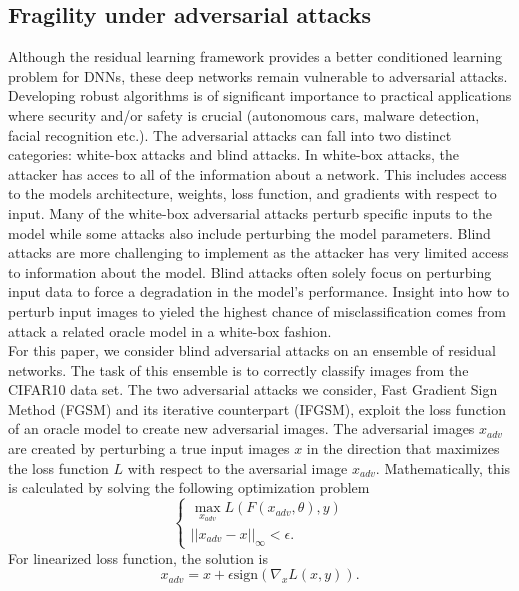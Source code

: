 \documentclass[12pt]{article}
\begin{document}
\subsection{Fragility under adversarial attacks}
Although the residual learning framework provides a better conditioned learning problem for DNNs, these deep networks remain vulnerable to adversarial attacks. Developing robust algorithms is of significant importance to practical applications where security and/or safety is crucial (autonomous cars, malware detection, facial recognition etc.). The adversarial attacks can fall into two distinct categories: white-box attacks and blind attacks. In white-box attacks, the attacker has acces to all of the information about a network. This includes access to the models architecture, weights, loss function, and gradients with respect to input. Many of the white-box adversarial attacks perturb specific inputs to the model while some attacks also include perturbing the model parameters. Blind attacks are more challenging to implement as the attacker has very limited access to information about the model. Blind attacks often solely focus on perturbing input data to force a degradation in the model's performance. Insight into how to perturb input images to yieled the highest chance of misclassification comes from attack a related oracle model in a white-box fashion.  \\
For this paper, we consider blind adversarial attacks on an ensemble of residual networks. The task of this ensemble is to correctly classify images from the CIFAR10 data set. The two adversarial attacks we consider, Fast Gradient Sign Method (FGSM) and its iterative counterpart (IFGSM), exploit the loss function of an oracle model to create new adversarial images. The adversarial images $x_{adv}$ are created by perturbing a true input images $x$ in the direction that maximizes the loss function $L$ with respect to the aversarial image $x_{adv}$. Mathematically, this is calculated by solving the following optimization problem
\begin{equation}
  \begin{cases} \max\limits_{x_{adv}} L(F(x_{adv}, \theta),y) \\
   || x_{adv} - x ||_{\infty} < \epsilon.
  \end{cases}
  \label{eq:opt}
\end{equation}
For linearized loss function, the solution is
\begin{equation}
x_{adv} = x + \epsilon\text{sign}(\nabla_x L(x,y)).
  \label{eq:FGSM}
\end{equation}
\end{document}
